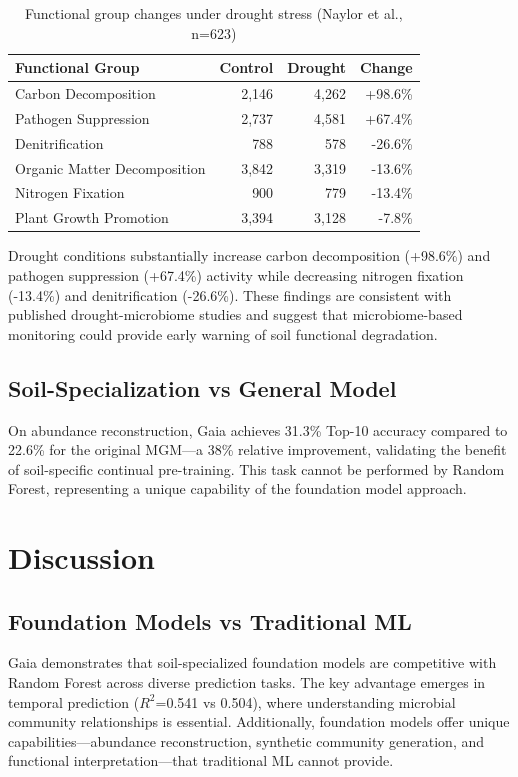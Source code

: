 \documentclass[11pt,a4paper]{article}
\begin{document}
\begin{table}[H]
\centering
\caption{Functional group changes under drought stress (Naylor et al., n=623)}
\label{tab:function}
\begin{tabular}{lrrr}
\toprule
Functional Group & Control & Drought & Change \\
\midrule
Carbon Decomposition & 2,146 & 4,262 & +98.6\% \\
Pathogen Suppression & 2,737 & 4,581 & +67.4\% \\
Denitrification & 788 & 578 & -26.6\% \\
Organic Matter Decomposition & 3,842 & 3,319 & -13.6\% \\
Nitrogen Fixation & 900 & 779 & -13.4\% \\
Plant Growth Promotion & 3,394 & 3,128 & -7.8\% \\
\bottomrule
\end{tabular}
\end{table}

Drought conditions substantially increase carbon decomposition (+98.6\%) and pathogen suppression (+67.4\%) activity while decreasing nitrogen fixation (-13.4\%) and denitrification (-26.6\%). These findings are consistent with published drought-microbiome studies and suggest that microbiome-based monitoring could provide early warning of soil functional degradation.

\subsection{Soil-Specialization vs General Model}

On abundance reconstruction, Gaia achieves 31.3\% Top-10 accuracy compared to 22.6\% for the original MGM---a 38\% relative improvement, validating the benefit of soil-specific continual pre-training. This task cannot be performed by Random Forest, representing a unique capability of the foundation model approach.

\section{Discussion}

\subsection{Foundation Models vs Traditional ML}

Gaia demonstrates that soil-specialized foundation models are competitive with Random Forest across diverse prediction tasks. The key advantage emerges in temporal prediction ($R^2$=0.541 vs 0.504), where understanding microbial community relationships is essential. Additionally, foundation models offer unique capabilities---abundance reconstruction, synthetic community generation, and functional interpretation---that traditional ML cannot provide.
\end{document}
